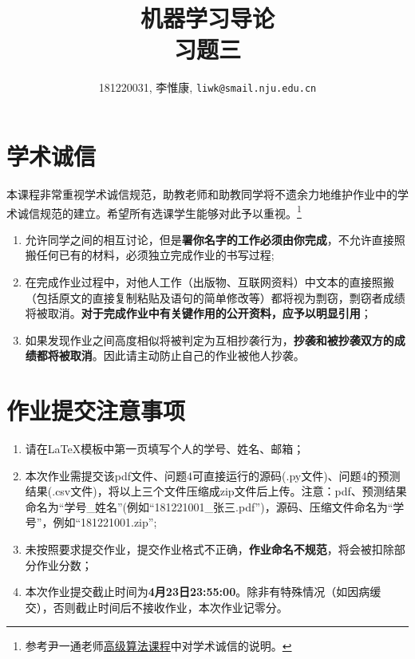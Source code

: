 \documentclass[a4paper,UTF8]{article}
\theoremstyle{definition}
\begin{document}
\title{\textbf{机器学习导论}\\\textbf{习题三}}
\author{181220031, 李惟康, \texttt{liwk@smail.nju.edu.cn}}
\maketitle


\section*{学术诚信}

本课程非常重视学术诚信规范，助教老师和助教同学将不遗余力地维护作业中的学术诚信规范的建立。希望所有选课学生能够对此予以重视。\footnote{参考尹一通老师\href{http://tcs.nju.edu.cn/wiki/}{高级算法课程}中对学术诚信的说明。}

\begin{tcolorbox}
	\begin{enumerate}
		\item[(1)] 允许同学之间的相互讨论，但是{\color{red}\textbf{署你名字的工作必须由你完成}}，不允许直接照搬任何已有的材料，必须独立完成作业的书写过程;
		\item[(2)] 在完成作业过程中，对他人工作（出版物、互联网资料）中文本的直接照搬（包括原文的直接复制粘贴及语句的简单修改等）都将视为剽窃，剽窃者成绩将被取消。{\color{red}\textbf{对于完成作业中有关键作用的公开资料，应予以明显引用}}；
		\item[(3)] 如果发现作业之间高度相似将被判定为互相抄袭行为，{\color{red}\textbf{抄袭和被抄袭双方的成绩都将被取消}}。因此请主动防止自己的作业被他人抄袭。
	\end{enumerate}
\end{tcolorbox}

\section*{作业提交注意事项}
\begin{tcolorbox}
	\begin{enumerate}
		\item[(1)] 请在LaTeX模板中第一页填写个人的学号、姓名、邮箱；
		\item[(2)] 本次作业需提交该pdf文件、问题4可直接运行的源码(.py文件)、问题4的预测结果(.csv文件)，将以上三个文件压缩成zip文件后上传。注意：pdf、预测结果命名为“学号\_姓名”(例如“181221001\_张三.pdf”)，源码、压缩文件命名为“学号”，例如“181221001.zip”;
		\item[(3)] 未按照要求提交作业，提交作业格式不正确，{\color{red}\textbf{作业命名不规范}}，将会被扣除部分作业分数；
		\item[(4)] 本次作业提交截止时间为{\color{red}\textbf{4月23日23:55:00}}。除非有特殊情况（如因病缓交），否则截止时间后不接收作业，本次作业记零分。
	\end{enumerate}
\end{tcolorbox}
\end{document}
